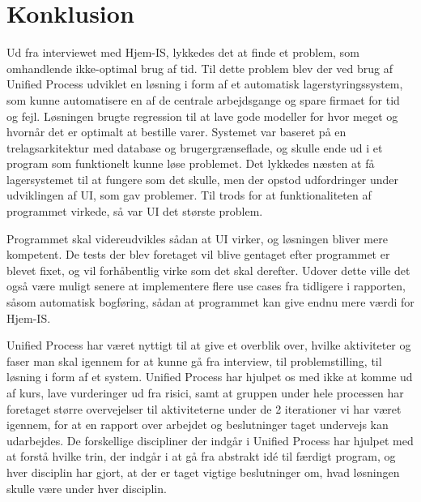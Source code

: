 \chapter{Konklusion}\label{ch:konklusion}

Ud fra interviewet med Hjem-IS, lykkedes det at finde et problem, som omhandlende ikke-optimal brug af tid. Til dette problem blev der ved brug af Unified Process\cite{UnifiedProcess} udviklet en løsning i form af et automatisk lagerstyringssystem, som kunne automatisere en af de centrale arbejdsgange og spare firmaet for tid og fejl. Løsningen brugte regression til at lave gode modeller for hvor meget og hvornår det er optimalt at bestille varer. Systemet var baseret på en trelagsarkitektur med database og brugergrænseflade, og skulle ende ud i et program som funktionelt kunne løse problemet.
Det lykkedes næsten at få lagersystemet til at fungere som det skulle, men der opstod udfordringer under udviklingen af UI, som gav problemer. Til trods for at funktionaliteten af programmet virkede, så var UI det største problem. 

Programmet skal videreudvikles sådan at UI virker, og løsningen bliver mere kompetent. De tests der blev foretaget vil blive gentaget efter programmet er blevet fixet, og vil forhåbentlig virke som det skal derefter. Udover dette ville det også være muligt senere at implementere flere use cases fra tidligere i rapporten, såsom automatisk bogføring, sådan at programmet kan give endnu mere værdi for Hjem-IS.

Unified Process har været nyttigt til at give et overblik over, hvilke aktiviteter og faser man skal igennem for at kunne gå fra interview, til problemstilling, til løsning i form af et system. Unified Process har hjulpet os med ikke at komme ud af kurs, lave vurderinger ud fra risici, samt at gruppen under hele processen har foretaget større overvejelser til aktiviteterne under de 2 iterationer vi har været igennem, for at en rapport over arbejdet og beslutninger taget undervejs kan udarbejdes. De forskellige discipliner der indgår i Unified Process har hjulpet med at forstå hvilke trin, der indgår i at gå fra abstrakt idé til færdigt program, og hver disciplin har gjort, at der er taget vigtige beslutninger om, hvad løsningen skulle være under hver disciplin. 

